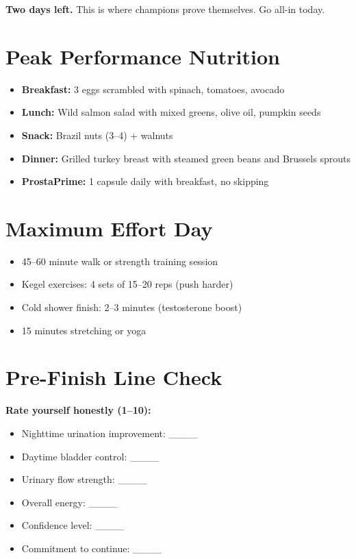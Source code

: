 \documentclass[11pt,oneside]{book}
\begin{document}
\textbf{Two days left.} This is where champions prove themselves. Go all-in today.

\section*{Peak Performance Nutrition}
\begin{itemize}[leftmargin=*]
\item \textbf{Breakfast:} 3 eggs scrambled with spinach, tomatoes, avocado
\item \textbf{Lunch:} Wild salmon salad with mixed greens, olive oil, pumpkin seeds
\item \textbf{Snack:} Brazil nuts (3--4) + walnuts
\item \textbf{Dinner:} Grilled turkey breast with steamed green beans and Brussels sprouts
\item \textbf{ProstaPrime:} 1 capsule daily with breakfast, no skipping
\end{itemize}

\section*{Maximum Effort Day}
\begin{itemize}[leftmargin=*]
\item 45--60 minute walk or strength training session
\item Kegel exercises: 4 sets of 15--20 reps (push harder)
\item Cold shower finish: 2--3 minutes (testosterone boost)
\item 15 minutes stretching or yoga
\end{itemize}

\section*{Pre-Finish Line Check}

\textbf{Rate yourself honestly (1--10):}
\begin{itemize}[leftmargin=*]
\item Nighttime urination improvement: \_\_\_\_
\item Daytime bladder control: \_\_\_\_
\item Urinary flow strength: \_\_\_\_
\item Overall energy: \_\_\_\_
\item Confidence level: \_\_\_\_
\item Commitment to continue: \_\_\_\_
\end{itemize}
\end{document}
